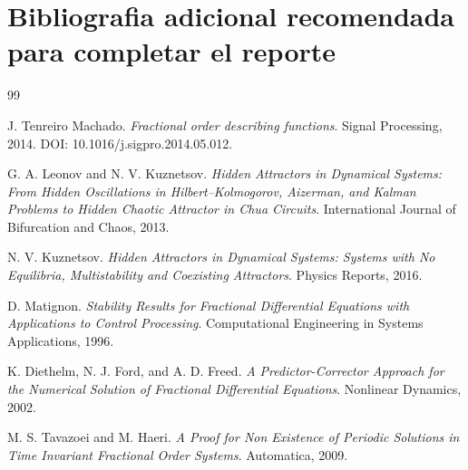 \documentclass[11pt]{article}
\begin{document}
\section{Bibliografia adicional recomendada para completar el reporte}

\begin{thebibliography}{99}

J. Tenreiro Machado.
\emph{Fractional order describing functions}.
Signal Processing, 2014.
DOI: 10.1016/j.sigpro.2014.05.012.

G. A. Leonov and N. V. Kuznetsov.
\emph{Hidden Attractors in Dynamical Systems: From Hidden Oscillations in
Hilbert--Kolmogorov, Aizerman, and Kalman Problems to Hidden Chaotic Attractor
in Chua Circuits}.
International Journal of Bifurcation and Chaos, 2013.

N. V. Kuznetsov.
\emph{Hidden Attractors in Dynamical Systems: Systems with No Equilibria,
Multistability and Coexisting Attractors}.
Physics Reports, 2016.

D. Matignon.
\emph{Stability Results for Fractional Differential Equations with Applications
to Control Processing}.
Computational Engineering in Systems Applications, 1996.

K. Diethelm, N. J. Ford, and A. D. Freed.
\emph{A Predictor-Corrector Approach for the Numerical Solution of Fractional
Differential Equations}.
Nonlinear Dynamics, 2002.

M. S. Tavazoei and M. Haeri.
\emph{A Proof for Non Existence of Periodic Solutions in Time Invariant
Fractional Order Systems}.
Automatica, 2009.

\end{thebibliography}
\end{document}
